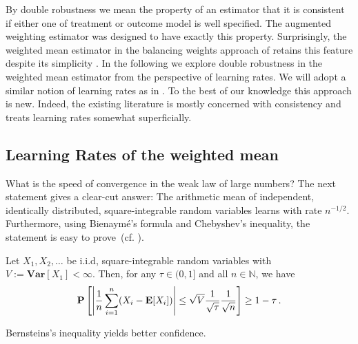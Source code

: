 
By double robustness we mean the property of an estimator that it is consistent if either one of treatment or outcome model is well specified.
The augmented weighting estimator was designed to have exactly this property.
Surprisingly, the weighted mean estimator in the balancing weights approach of \cite{Wang2019} retains this feature despite its simplicity \cite{Zhao2017a}. 
In the following we explore double robustness in the weighted mean estimator from the perspective of learning rates.
We will adopt a similar notion of learning rates as in \cite{Steinwart2008}.
To the best of our knowledge this approach is new. Indeed, the existing literature is mostly concerned with consistency and treats learning rates somewhat superficially. 
\subsection{Learning Rates of the weighted mean}

What is the speed of convergence in the weak law of large numbers?
The next statement gives a clear-cut answer:
The arithmetic mean of independent, identically distributed, square-integrable random variables 
learns with rate $n^{-1/2}$.
Furthermore, using
Bienaymé's formula and Chebyshev's inequality, the statement is easy to prove~(cf. \cite[Theorem~5.14]{Klenke2020}).


\begin{theorem*}
  Let 
  $
    X_1,X_2,\ldots
  $
  be i.i.d, square-integrable random variables with 
  $
    V:=
    \mathbf{Var}[X_1]
    <\infty
  $.
  Then, for any $\tau \in (0,1]$ and all $n\in\mathbb{N}$, we have
  \begin{gather}
   \mathbf{P}
   \left[
     \left| 
   \frac{1}{n}
   \sum_{i=1}^{n}
   (X_i - \mathbf{E}[X_i])
     \right|
     \le
     \sqrt{V}
     \frac{1}{\sqrt{\tau}}
     \frac{1}{\sqrt{n}}
   \right]
   \ge
   1-\tau\,.
  \end{gather}
\end{theorem*}
\begin{reflection*}
  Bernsteins's inequality yields better confidence.
\end{reflection*}


